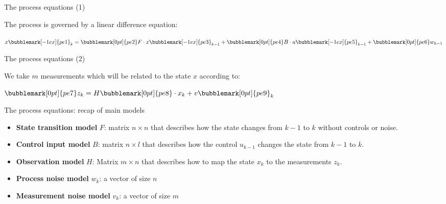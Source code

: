 \documentclass[compress]{beamer}
\begin{document}
\begin{frame}{The process equations (1)}

    The process is governed by a linear difference equation:

    \vspace{4em}

    \Huge\centering
    $x\bubblemark[-1ex]{pe1}_k = \bubblemark[0pt]{pe2}F \cdot x\bubblemark[-1ex]{pe3}_{k-1} + \bubblemark[0pt]{pe4}B \cdot u\bubblemark[-1ex]{pe5}_{k-1} + \bubblemark[0pt]{pe6}w_{k-1}$


\end{frame}

\begin{frame}{The process equations (2)}

    We take $m$ measurements which will be related to the state
  $x$ according to:

    \vspace{3em}

    \Huge\centering
    $\bubblemark[0pt]{pe7}z_k = H\bubblemark[0pt]{pe8} \cdot x_k + v\bubblemark[0pt]{pe9}_k$


\end{frame}

\begin{frame}{The process equations: recap of main models}

\begin{itemize}
    \item \textbf{State transition model} $F$: matrix $n \times n$ that describes how the state
  changes from $k-1$ to $k$ without controls or noise.
    \item \textbf{Control input model} $B$: matrix $n \times l$ that describes how the
        control $u_{k-1}$ changes the state from $k-1$ to $k$.
    \item \textbf{Observation model} $H$: Matrix $m \times n$ that describes how to map the
  state $x_k$ to the measurements $z_k$.
\end{itemize}

\pause

    \begin{itemize}
        \item \textbf{Process noise model} $w_k$: a vector of size $n$
        \item \textbf{Measurement noise model} $v_k$: a vector of size $m$
    \end{itemize}

\end{frame}
\end{document}
